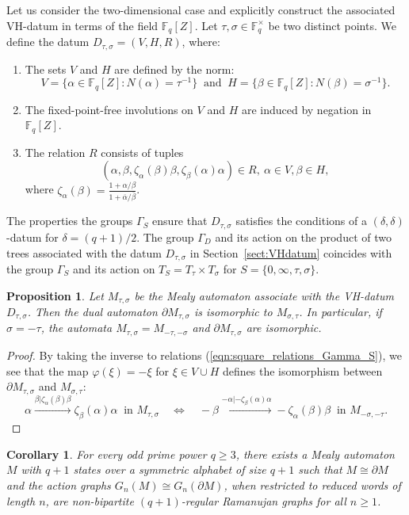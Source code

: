\documentclass[12pt]{article}
\newtheorem{proposition}[theorem]{Proposition}
\newtheorem{corollary}{Corollary}[theorem]
\theoremstyle{definition}
\def\bF{{\mathbb F}}
\begin{document}
Let us consider the two-dimensional case and explicitly construct the associated VH-datum in terms of the field $\bF_q[Z]$. Let $\tau,\sigma\in\bF_q^{\times}$ be two distinct points. We define the datum $D_{\tau,\sigma}=(V,H,R)$, where:
\begin{enumerate}
  \item The sets $V$ and $H$ are defined by the norm:
\[
V=\{ \alpha\in \bF_q[Z] : N(\alpha)=\tau^{-1} \} \ \mbox{ and } \ H=\{ \beta\in \bF_q[Z] : N(\beta)=\sigma^{-1} \}.
\]
  \item The fixed-point-free involutions on $V$ and $H$ are induced by negation in $\bF_q[Z]$.
  \item The relation $R$ consists of tuples
\[
(\alpha,\beta,\zeta_\alpha(\beta)\beta, \zeta_\beta(\alpha)\alpha)\in R, \ \alpha\in V, \beta\in H,
\]
where $\zeta_{\alpha}(\beta) = \frac{1 + \alpha/\beta}{1 + \overline{\alpha}/\overline{\beta}}$.
\end{enumerate}
The properties the groups $\Gamma_S$ ensure that $D_{\tau,\sigma}$ satisfies the conditions of a $(\delta,\delta)$-datum for $\delta=(q+1)/2$. The group $\Gamma_{D}$ and its action on the product of two trees associated with the datum $D_{\tau,\sigma}$ in Section~\ref{sect:VHdatum} coincides with the group $\Gamma_{S}$ and its action on $T_{S}=T_{\tau}\times T_{\sigma}$ for $S=\{0,\infty,\tau,\sigma\}$.

\begin{proposition}
Let $M_{\tau,\sigma}$ be the Mealy automaton associate with the VH-datum $D_{\tau,\sigma}$. Then the dual automaton $\partial M_{\tau,\sigma}$ is isomorphic to $M_{\sigma,\tau}$. In particular, if $\sigma=-\tau$, the automata $M_{\tau,\sigma}=M_{-\tau,-\sigma}$ and $\partial M_{\tau,\sigma}$ are isomorphic.
\end{proposition}
\begin{proof}
By taking the inverse to relations (\ref{eqn:square_relations_Gamma_S}), we see that the map $\varphi(\xi)=-\xi$ for $\xi\in V\cup H$ defines the isomorphism between $\partial M_{\tau,\sigma}$ and $M_{\sigma,\tau}$:
\[
\alpha\xrightarrow{\beta | \zeta_\alpha(\beta)\beta} \zeta_\beta(\alpha)\alpha \ \mbox{ in $M_{\tau,\sigma}$} \quad \Leftrightarrow \quad -\beta\xrightarrow{-\alpha | -\zeta_\beta(\alpha)\alpha} -\zeta_\alpha(\beta)\beta  \ \mbox{ in $M_{-\sigma,-\tau}$}.
\]
\end{proof}

\begin{corollary}
For every odd prime power $q\geq 3$, there exists a Mealy automaton $M$ with $q+1$ states over a symmetric alphabet of size $q+1$ such that $M\cong \partial M$ and the action graphs $G_n(M)\cong G_n(\partial M)$, when restricted to reduced words of length $n$, are non-bipartite $(q+1)$-regular Ramanujan graphs for all $n\geq 1$.
\end{corollary}
\end{document}

